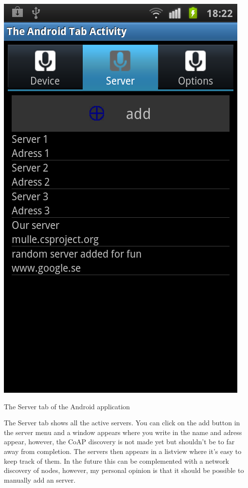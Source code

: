  \includegraphics[scale=0.75]{android-server.png}\caption{The Server tab of the Android application}
The Server tab shows all the active servers. You can click on the add button in the server menu and a window appears where you write in the name and adress appear, 
however, the CoAP discovery is not made yet but shouldn't be to far away from completion. The servers then appears in a listview where it's easy to keep track of them.
In the future this can be complemented with a network discovery of nodes, however, my personal opinion is that it should be possible to manually add an server.


